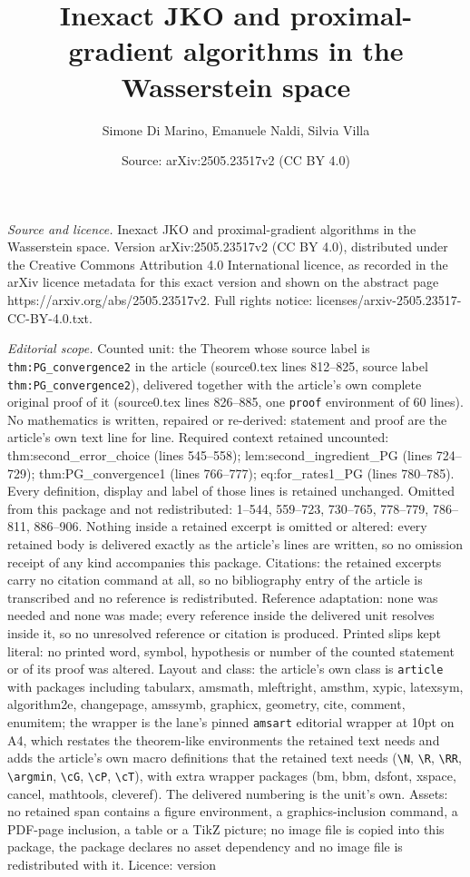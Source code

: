 \documentclass[10pt,a4paper]{amsart}
\title[Inexact JKO and proximal-gradient algorithms in the Wasserst]{Inexact JKO and proximal-gradient algorithms in the Wasserstein space}
\author{Simone Di Marino, Emanuele Naldi, Silvia Villa}
\date{Source: arXiv:2505.23517v2 (CC BY 4.0)}
\begin{document}
\maketitle

\noindent\emph{Source and licence.} Inexact JKO and proximal-gradient algorithms in the Wasserstein space. Version arXiv:2505.23517v2 (CC BY 4.0), distributed under the Creative Commons Attribution 4.0 International licence, as recorded in the arXiv licence metadata for this exact version and shown on the abstract page https://arxiv.org/abs/2505.23517v2. Full rights notice: licenses/arxiv-2505.23517-CC-BY-4.0.txt.\par\smallskip

\noindent\textit{Editorial scope.} Counted unit: the Theorem whose source label is \texttt{thm:PG\_convergence2} in the article (source0.tex lines 812--825, source label \texttt{thm:PG\_convergence2}), delivered together with the article's own complete original proof of it (source0.tex lines 826--885, one \texttt{proof} environment of 60 lines). No mathematics is written, repaired or re-derived: statement and proof are the article's own text line for line. Required context retained uncounted: thm:second\_error\_choice (lines 545--558); lem:second\_ingredient\_PG (lines 724--729); thm:PG\_convergence1 (lines 766--777); eq:for\_rates1\_PG (lines 780--785). Every definition, display and label of those lines is retained unchanged. Omitted from this package and not redistributed: 1--544, 559--723, 730--765, 778--779, 786--811, 886--906. Nothing inside a retained excerpt is omitted or altered: every retained body is delivered exactly as the article's lines are written, so no omission receipt of any kind accompanies this package. Citations: the retained excerpts carry no citation command at all, so no bibliography entry of the article is transcribed and no reference is redistributed. Reference adaptation: none was needed and none was made; every reference inside the delivered unit resolves inside it, so no unresolved reference or citation is produced. Printed slips kept literal: no printed word, symbol, hypothesis or number of the counted statement or of its proof was altered. Layout and class: the article's own class is \texttt{article} with packages including tabularx, amsmath, mleftright, amsthm, xypic, latexsym, algorithm2e, changepage, amssymb, graphicx, geometry, cite, comment, enumitem; the wrapper is the lane's pinned \texttt{amsart} editorial wrapper at 10pt on A4, which restates the theorem-like environments the retained text needs and adds the article's own macro definitions that the retained text needs (\texttt{\textbackslash N}, \texttt{\textbackslash R}, \texttt{\textbackslash RR}, \texttt{\textbackslash argmin}, \texttt{\textbackslash cG}, \texttt{\textbackslash cP}, \texttt{\textbackslash cT}), with extra wrapper packages (bm, bbm, dsfont, xspace, cancel, mathtools, cleveref). The delivered numbering is the unit's own. Assets: no retained span contains a figure environment, a graphics-inclusion command, a PDF-page inclusion, a table or a TikZ picture; no image file is copied into this package, the package declares no asset dependency and no image file is redistributed with it. Licence: version 
\end{document}
